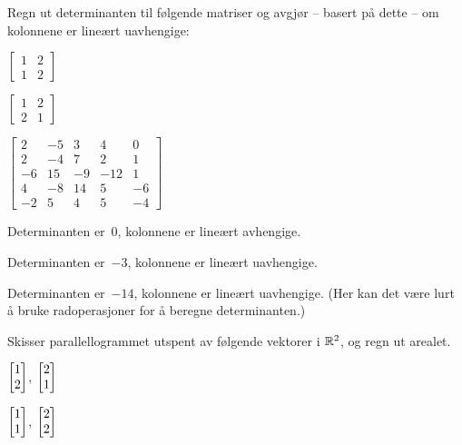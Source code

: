 
\begin{oppgave}
Regn ut determinanten til følgende matriser og avgjør -- basert på
dette -- om kolonnene er lineært uavhengige:
\begin{punkt}
$
\begin{bmatrix}
1 & 2\\
1 & 2
\end{bmatrix}
$
\end{punkt}
\begin{punkt}
$
\begin{bmatrix}
1 & 2\\
2 & 1
\end{bmatrix}
$
\end{punkt}
\begin{punkt}
$
\begin{bmatrix}
2 & -5 & 3 & 4 & 0 \\
2 & -4 & 7 & 2 & 1 \\
-6 & 15 & -9 & -12 & 1 \\
4 & -8 & 14 & 5 & -6 \\
-2 & 5 & 4 & 5 & -4
\end{bmatrix}
$
\end{punkt}
\end{oppgave}

\begin{losning}
\begin{punkt}
Determinanten er~$0$, kolonnene er lineært avhengige.
\end{punkt}

\begin{punkt}
Determinanten er~$-3$, kolonnene er lineært uavhengige.
\end{punkt}

\begin{punkt}
Determinanten er~$-14$, kolonnene er lineært uavhengige.
(Her kan det være lurt å bruke radoperasjoner for å beregne determinanten.)
\end{punkt}

\end{losning}


\begin{oppgave}
Skisser parallellogrammet utspent av følgende vektorer i $\mathbb{R}^2$, og
regn ut arealet.
\begin{punkt}
$\begin{bmatrix} 1 \\ 2 \end{bmatrix}$, $\begin{bmatrix} 2 \\ 1 \end{bmatrix}$
\end{punkt}
\begin{punkt}
$\begin{bmatrix} 1 \\ 1 \end{bmatrix}$,
$\begin{bmatrix} 2 \\ 2 \end{bmatrix}$
\end{punkt}
\end{oppgave}

